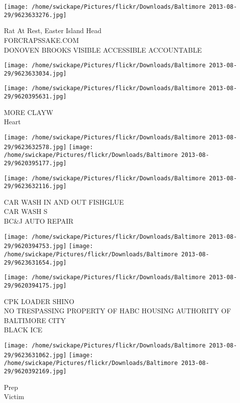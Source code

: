 \documentclass[10pt,letterpaper]{article}
\begin{document}
\texttt{[image: /home/swickape/Pictures/flickr/Downloads/Baltimore 2013-08-29/9623633276.jpg]}

Rat At Rest, Easter Island Head\\
FORCRAPSSAKE.COM\\
DONOVEN BROOKS VISIBLE ACCESSIBLE ACCOUNTABLE
\pagebreak

\texttt{[image: /home/swickape/Pictures/flickr/Downloads/Baltimore 2013-08-29/9623633034.jpg]}

\vspace{0.25in}
\texttt{[image: /home/swickape/Pictures/flickr/Downloads/Baltimore 2013-08-29/9620395631.jpg]}

MORE CLAYW\\
Heart
\pagebreak

\texttt{[image: /home/swickape/Pictures/flickr/Downloads/Baltimore 2013-08-29/9623632578.jpg]}
\texttt{[image: /home/swickape/Pictures/flickr/Downloads/Baltimore 2013-08-29/9620395177.jpg]}

\vspace{0.25in}
\texttt{[image: /home/swickape/Pictures/flickr/Downloads/Baltimore 2013-08-29/9623632116.jpg]}

CAR WASH IN AND OUT FISHGLUE\\
CAR WASH S\\
BC\&J AUTO REPAIR
\pagebreak

\texttt{[image: /home/swickape/Pictures/flickr/Downloads/Baltimore 2013-08-29/9620394753.jpg]}
\texttt{[image: /home/swickape/Pictures/flickr/Downloads/Baltimore 2013-08-29/9623631654.jpg]}

\vspace{0.25in}
\texttt{[image: /home/swickape/Pictures/flickr/Downloads/Baltimore 2013-08-29/9620394175.jpg]}

CPK LOADER SHINO\\
NO TRESPASSING PROPERTY OF HABC HOUSING AUTHORITY OF BALTIMORE CITY\\
BLACK ICE
\pagebreak

\texttt{[image: /home/swickape/Pictures/flickr/Downloads/Baltimore 2013-08-29/9623631062.jpg]}
\texttt{[image: /home/swickape/Pictures/flickr/Downloads/Baltimore 2013-08-29/9620392169.jpg]}

Prep\\
Victim
\pagebreak
\end{document}
